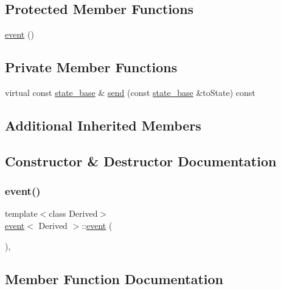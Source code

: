 \subsection*{Protected Member Functions}
\begin{DoxyCompactItemize}
\item 
\mbox{\hyperlink{classevent_abfdefa67c9e32c767d54939e5b94445b}{event}} ()
\end{DoxyCompactItemize}
\subsection*{Private Member Functions}
\begin{DoxyCompactItemize}
\item 
virtual const \mbox{\hyperlink{classstate__base}{state\+\_\+base}} \& \mbox{\hyperlink{classevent_a6a5e444760d40536984c676f8fee77f3}{send}} (const \mbox{\hyperlink{classstate__base}{state\+\_\+base}} \&to\+State) const
\end{DoxyCompactItemize}
\subsection*{Additional Inherited Members}


\subsection{Constructor \& Destructor Documentation}
\mbox{\label{classevent_abfdefa67c9e32c767d54939e5b94445b}} 
\subsubsection{\texorpdfstring{event()}{event()}}
{\footnotesize\ttfamily template$<$class Derived$>$ \\
\mbox{\hyperlink{classevent}{event}}$<$ Derived $>$\+::\mbox{\hyperlink{classevent}{event}} (\begin{DoxyParamCaption}{ }\end{DoxyParamCaption})\hspace{0.3cm}{\ttfamily [inline]}, {\ttfamily [protected]}}



\subsection{Member Function Documentation}
\mbox{\label{classevent_a6a5e444760d40536984c676f8fee77f3}} 
